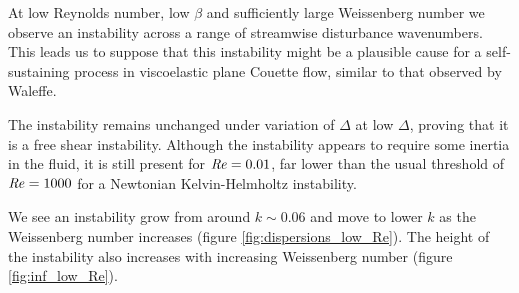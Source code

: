 \documentclass{jfm}
\newcommand\Rey{\mbox{\textit{Re}}}  %
\begin{document}
At low Reynolds number, low $\beta$ and sufficiently large Weissenberg number
we observe an instability across a range of streamwise disturbance wavenumbers.
This leads us to suppose that this instability might be a plausible cause for a
self-sustaining process in viscoelastic plane Couette flow, similar to that
observed by Waleffe.

The instability remains unchanged under variation of $\Delta$ at low $\Delta$,
proving that it is a free shear instability. Although the instability appears
to require some inertia in the fluid, it is still present for  $\Rey = 0.01$,
far lower than the usual threshold of $\Rey = 1000$ for a Newtonian
Kelvin-Helmholtz instability.

We see an instability grow from around $k \sim 0.06$ and move to lower $k$ as
the Weissenberg number increases (figure \ref{fig:dispersions_low_Re}). The
height of the instability also increases with increasing Weissenberg number
(figure \ref{fig:inf_low_Re}). 
\end{document}
